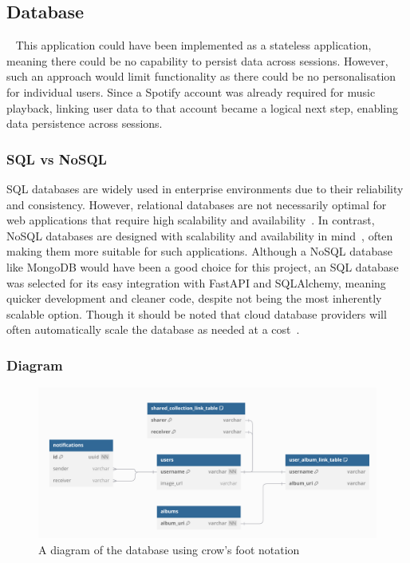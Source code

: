 \subsection{Database}~\label{sec:database}
This application could have been implemented as a stateless application, meaning there could be no capability to persist data across sessions. However, such an approach would limit functionality as there could be no personalisation for individual users. Since a Spotify account was already required for music playback, linking user data to that account became a logical next step, enabling data persistence across sessions.

\subsubsection{SQL vs NoSQL}
SQL databases are widely used in enterprise environments due to their reliability and consistency. However, relational databases are not necessarily optimal for web applications that require high scalability and availability~\cite{GANESHCHANDRA201513}. In contrast, NoSQL databases are designed with scalability and availability in mind~\cite{NoSQL}, often making them more suitable for such applications.
Although a NoSQL database like MongoDB would have been a good choice for this project, an SQL database was selected for its easy integration with FastAPI and SQLAlchemy, meaning quicker development and cleaner code, despite not being the most inherently scalable option. Though it should be noted that cloud database providers will often automatically scale the database as needed at a cost~\cite{CloudSQLScaling}.

\subsubsection{Diagram}
\begin{figure} [H]
    \centering
    \includegraphics[width=0.6\linewidth]{figures/db_diagram.png}
    \caption{A diagram of the database using crow's foot notation}
    \label{fig:database-diagram}
\end{figure}


